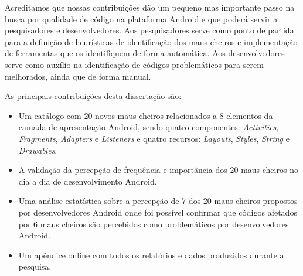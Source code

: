 Acreditamos que nossas contribuições dão um pequeno mas importante passo na busca por qualidade de código na plataforma Android e que poderá servir a pesquisadores e desenvolvedores. Aos pesquisadores serve como ponto de partida para a definição de heurísticas de identificação dos maus cheiros e implementação de ferramentas que os identifiquem de forma automática. Aos desenvolvedores serve como auxílio na identificação de códigos problemáticos para serem melhorados, ainda que de forma manual.

As principais contribuições desta dissertação são:

\begin{itemize}
  \item Um catálogo com 20 novos maus cheiros relacionados a 8 elementos da camada de apresentação Android, sendo quatro componentes: \textit{Activities}, \textit{Fragments}, \textit{Adapters} e \textit{Listeners} e quatro recursos: \textit{Layouts}, \textit{Styles}, \textit{String} e \textit{Drawables}.
  
  \item A validação da percepção de frequência e importância dos 20 maus cheiros no dia a dia de desenvolvimento Android.

  \item Uma análise estatística sobre a percepção de 7 dos 20 maus cheiros propostos por desenvolvedores Android onde foi possível confirmar que códigos afetados por 6 maus cheiros são percebidos como problemáticos por desenvolvedores Android.

  \item Um apêndice online \cite{apendice} com todos os relatórios e dados produzidos durante a pesquisa.
\end{itemize}


